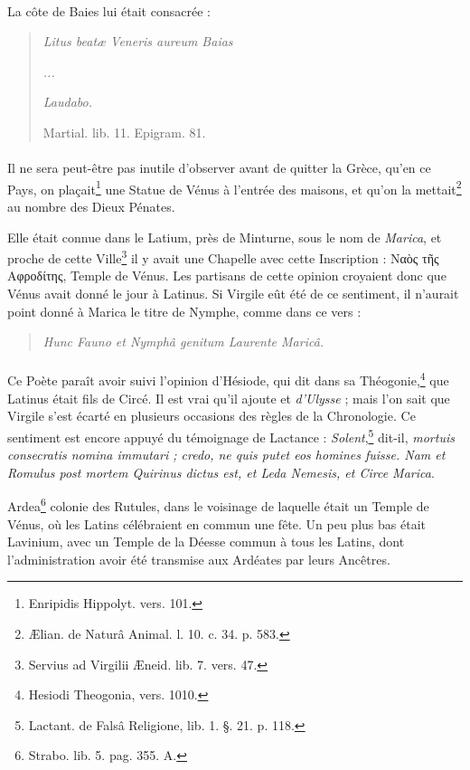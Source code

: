\documentclass[a4paper, 18pt, oneside]{article}
\begin{document}
\paragraph{}
La côte de Baies lui était consacrée :
\begin{quotation}
\emph{Litus beatæ Veneris aureum Baias}

\emph{...}

\emph{Laudabo.}

\hspace*{30mm}Martial. lib. 11. Epigram. 81.
\end{quotation}
\paragraph{}
Il ne sera peut-être pas inutile d'observer avant de quitter la Grèce, qu'en ce Pays, on plaçait\footnote{Enripidis Hippolyt. vers. 101.} une Statue de Vénus à l'entrée des maisons, et qu'on la mettait\footnote{Ælian. de Naturâ Animal. l. 10. c. 34. p. 583.} au nombre des Dieux Pénates.

Elle était connue dans le Latium, près de Minturne, sous le nom de \emph{Marica}, et proche de cette Ville\footnote{Servius ad Virgilii Æneid. lib. 7. vers. 47.} il y avait une Chapelle avec cette Inscription : Ναὸς τῆς Αφροδίτης, Temple de Vénus. Les partisans de cette opinion croyaient donc que Vénus avait donné le jour à Latinus. Si Virgile eût été de ce sentiment, il n'aurait point donné à Marica le titre de Nymphe, comme dans ce vers :
\begin{quotation}
\emph{Hunc Fauno et Nymphâ genitum Laurente Maricâ.}
\end{quotation}
\paragraph{}
Ce Poète paraît avoir suivi l'opinion d'Hésiode, qui dit dans sa Théogonie,\footnote{Hesiodi Theogonia, vers. 1010.} que Latinus était fils de Circé. Il est vrai qu'il ajoute et \emph{d'Ulysse} ; mais l'on sait que Virgile s'est écarté en plusieurs occasions des règles de la Chronologie. Ce sentiment est encore appuyé du témoignage de Lactance : \emph{Solent},\footnote{Lactant. de Falsâ Religione, lib. 1. §. 21. p. 118.} dit-il, \emph{mortuis consecratis nomina immutari ; credo, ne quis putet eos homines fuisse. Nam et Romulus post mortem Quirinus dictus est, et Leda Nemesis, et Circe Marica}.

Ardea\footnote{Strabo. lib. 5. pag. 355. A.} colonie des Rutules, dans le voisinage de laquelle était un Temple de Vénus, où les Latins célébraient en commun une fête. Un peu plus bas était Lavinium, avec un Temple de la Déesse commun à tous les Latins, dont l'administration avoir été transmise aux Ardéates par leurs Ancêtres.
\end{document}
